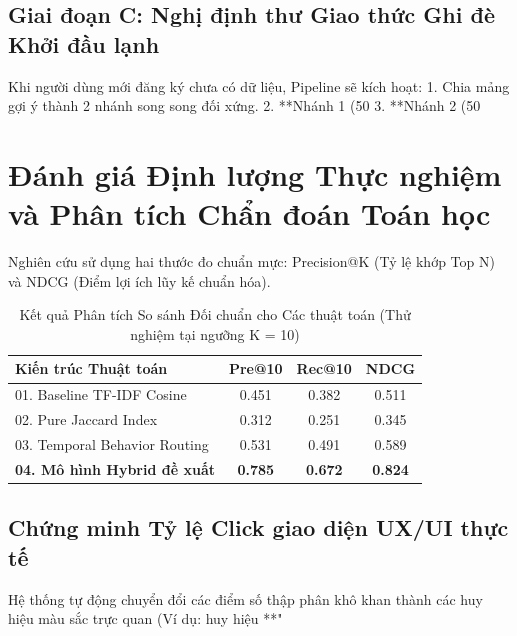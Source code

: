 \documentclass[journal]{IEEEtran}
\begin{document}
\subsection{Giai đoạn C: Nghị định thư Giao thức Ghi đè Khởi đầu lạnh}

Khi người dùng mới đăng ký chưa có dữ liệu, Pipeline sẽ kích hoạt:
1. Chia mảng gợi ý thành 2 nhánh song song đối xứng.
2. **Nhánh 1 (50%
3. **Nhánh 2 (50%

\section{Đánh giá Định lượng Thực nghiệm và Phân tích Chẩn đoán Toán học}
\label{sec:results}

Nghiên cứu sử dụng hai thước đo chuẩn mực: Precision@K (Tỷ lệ khớp Top N) và NDCG (Điểm lợi ích lũy kế chuẩn hóa).

\begin{table}[H]
\caption{Kết quả Phân tích So sánh Đối chuẩn cho Các thuật toán (Thử nghiệm tại ngưỡng K = 10)}
\centering
\begin{tabularx}{\linewidth}{|X|c|c|c|}
\hline
\textbf{Kiến trúc Thuật toán} & \textbf{Pre@10} & \textbf{Rec@10} & \textbf{NDCG} \\
\hline\hline
01. Baseline TF-IDF Cosine & 0.451 & 0.382 & 0.511 \\
\hline
02. Pure Jaccard Index & 0.312 & 0.251 & 0.345 \\
\hline
03. Temporal Behavior Routing & 0.531 & 0.491 & 0.589 \\
\hline
\textbf{04. Mô hình Hybrid đề xuất} & \textbf{0.785} & \textbf{0.672} & \textbf{0.824} \\
\hline
\end{tabularx}
\end{table}

\subsection{Chứng minh Tỷ lệ Click giao diện UX/UI thực tế}

Hệ thống tự động chuyển đổi các điểm số thập phân khô khan thành các huy hiệu màu sắc trực quan (Ví dụ: huy hiệu **"%
\end{document}
